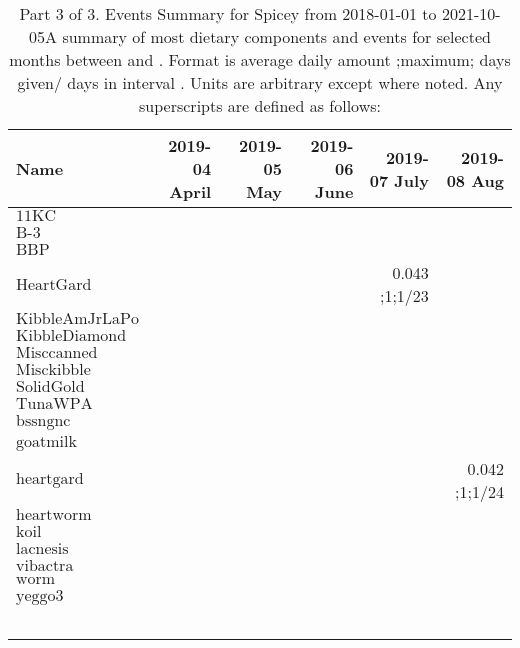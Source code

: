 \begin{table}[H]
\centering
\begin{tabular}{|l|r|r|r|r|r|}
\hline
Name&2019-04 April&2019-05 May&2019-06 June&2019-07 July&2019-08 Aug\\
\hline
$\textrm{11KC}$&&&&&\\
$\textrm{B-3}$&&&&&\\
$\textrm{BBP}$&&&&&\\
$\textrm{HeartGard}$&&&&0.043 ;1;1/23&\\
$\textrm{KibbleAmJrLaPo}$&&&&&\\
$\textrm{KibbleDiamond}$&&&&&\\
$\textrm{Misccanned}$&&&&&\\
$\textrm{Misckibble}$&&&&&\\
$\textrm{SolidGold}$&&&&&\\
$\textrm{TunaWPA}$&&&&&\\
$\textrm{bssngnc}$&&&&&\\
$\textrm{goatmilk}$&&&&&\\
$\textrm{heartgard}$&&&&&0.042 ;1;1/24\\
$\textrm{heartworm}$&&&&&\\
$\textrm{koil}$&&&&&\\
$\textrm{lacnesis}$&&&&&\\
$\textrm{vibactra}$&&&&&\\
$\textrm{worm}$&&&&&\\
$\textrm{yeggo3}$&&&&&\\
&&&&&\\
&&&&&\\
&&&&&\\
&&&&&\\
&&&&&\\
\hline
\end{tabular}
\caption{Part 3 of 3.  Events Summary for Spicey   from 2018-01-01 to 2021-10-05A summary of most dietary components and events  for selected months between \mjmdatemin and \mjmdatemax. Format is average daily amount ;maximum; days given/ days in interval . Units are arbitrary except where noted. Any  superscripts are defined as follows:  \mjmsuperscripts}
\end{table}
